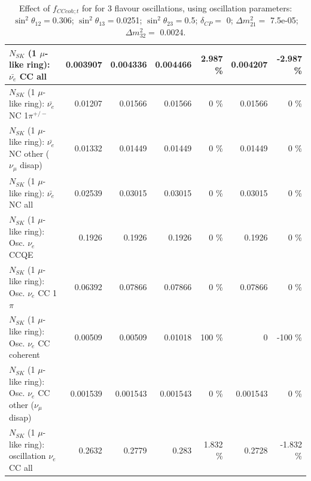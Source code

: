 \begin{table}
\begin{tabular}{| l | r | r | r  r | r  r |}
                            $N_{SK}$ (1 $\mu$-like ring): $\bar{\nu_{e}}$ CC all &        0.003907 &        0.004336 &        0.004466 &    2.987 \%  &        0.004207 &   -2.987 \%  \\ 
\hline
                     $N_{SK}$ (1 $\mu$-like ring): $\bar{\nu_e}$ NC 1$\pi^{+/-}$ &         0.01207 &         0.01566 &         0.01566 &        0 \%  &         0.01566 &        0 \%  \\ 
          $N_{SK}$ (1 $\mu$-like ring): $\bar{\nu_e}$ NC other ($\nu_\mu$ disap) &         0.01332 &         0.01449 &         0.01449 &        0 \%  &         0.01449 &        0 \%  \\ 
                            $N_{SK}$ (1 $\mu$-like ring): $\bar{\nu_{e}}$ NC all &         0.02539 &         0.03015 &         0.03015 &        0 \%  &         0.03015 &        0 \%  \\ 
\hline
\hline
\hline
                                 $N_{SK}$ (1 $\mu$-like ring): Osc. $\nu_e$ CCQE &          0.1926 &          0.1926 &          0.1926 &        0 \%  &          0.1926 &        0 \%  \\ 
                            $N_{SK}$ (1 $\mu$-like ring): Osc. $\nu_e$ CC 1$\pi$ &         0.06392 &         0.07866 &         0.07866 &        0 \%  &         0.07866 &        0 \%  \\ 
                          $N_{SK}$ (1 $\mu$-like ring): Osc. $\nu_e$ CC coherent &         0.00509 &         0.00509 &         0.01018 &      100 \%  &               0 &     -100 \%  \\ 
           $N_{SK}$ (1 $\mu$-like ring): Osc. $\nu_e$ CC other ($\nu_\mu$ disap) &        0.001539 &        0.001543 &        0.001543 &        0 \%  &        0.001543 &        0 \%  \\ 
                        $N_{SK}$ (1 $\mu$-like ring): oscillation $\nu_e$ CC all &          0.2632 &          0.2779 &           0.283 &    1.832 \%  &          0.2728 &   -1.832 \%  \\ 
\hline
\hline
\end{tabular}
\caption{ Effect of $f_{CCcoh; t}$ for for 3 flavour oscillations, using oscillation parameters:  $\sin^2\theta_{12} = $0.306; $\sin^2\theta_{13} = $0.0251; $\sin^2\theta_{23} = $0.5; $\delta_{CP} = $        0; $\Delta m^2_{21} = $    7.5e-05; $\Delta m^2_{32} = $    0.0024. }
\label{tab:num_xsec_norm_cccoh_1RmuT_3f_osc_t13:0.0251}
\end{table}
\clearpage
